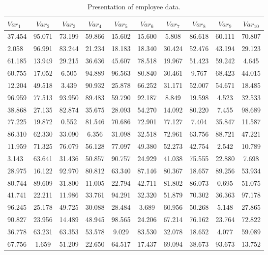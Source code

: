 \documentclass{article}
\begin{document}
\begin{table}[h!]
\centering
\caption{Presentation of employee data.}
\label{tab:data_emp}
\begin{tabular}{lccccccccc}
\toprule
$Var_1$ & $Var_2$ & $Var_3$ & $Var_4$ & $Var_5$ & $Var_6$ & $Var_7$ & $Var_8$ & $Var_9$ & $Var_{10}$ \\
\midrule
37.454 & 95.071 & 73.199 & 59.866 & 15.602 & 15.600 & 5.808 & 86.618 & 60.111 & 70.807 \\
2.058 & 96.991 & 83.244 & 21.234 & 18.183 & 18.340 & 30.424 & 52.476 & 43.194 & 29.123 \\
61.185 & 13.949 & 29.215 & 36.636 & 45.607 & 78.518 & 19.967 & 51.423 & 59.242 & 4.645 \\
60.755 & 17.052 & 6.505 & 94.889 & 96.563 & 80.840 & 30.461 & 9.767 & 68.423 & 44.015 \\
12.204 & 49.518 & 3.439 & 90.932 & 25.878 & 66.252 & 31.171 & 52.007 & 54.671 & 18.485 \\
96.959 & 77.513 & 93.950 & 89.483 & 59.790 & 92.187 & 8.849 & 19.598 & 4.523 & 32.533 \\
38.868 & 27.135 & 82.874 & 35.675 & 28.093 & 54.270 & 14.092 & 80.220 & 7.455 & 98.689 \\
77.225 & 19.872 & 0.552 & 81.546 & 70.686 & 72.901 & 77.127 & 7.404 & 35.847 & 11.587 \\
86.310 & 62.330 & 33.090 & 6.356 & 31.098 & 32.518 & 72.961 & 63.756 & 88.721 & 47.221 \\
11.959 & 71.325 & 76.079 & 56.128 & 77.097 & 49.380 & 52.273 & 42.754 & 2.542 & 10.789 \\
3.143 & 63.641 & 31.436 & 50.857 & 90.757 & 24.929 & 41.038 & 75.555 & 22.880 & 7.698 \\
28.975 & 16.122 & 92.970 & 80.812 & 63.340 & 87.146 & 80.367 & 18.657 & 89.256 & 53.934 \\
80.744 & 89.609 & 31.800 & 11.005 & 22.794 & 42.711 & 81.802 & 86.073 & 0.695 & 51.075 \\
41.741 & 22.211 & 11.986 & 33.761 & 94.291 & 32.320 & 51.879 & 70.302 & 36.363 & 97.178 \\
96.245 & 25.178 & 49.725 & 30.088 & 28.484 & 3.689 & 60.956 & 50.268 & 5.148 & 27.865 \\
90.827 & 23.956 & 14.489 & 48.945 & 98.565 & 24.206 & 67.214 & 76.162 & 23.764 & 72.822 \\
36.778 & 63.231 & 63.353 & 53.578 & 9.029 & 83.530 & 32.078 & 18.652 & 4.077 & 59.089 \\
67.756 & 1.659 & 51.209 & 22.650 & 64.517 & 17.437 & 69.094 & 38.673 & 93.673 & 13.752 \\

\end{tabular}
\end{table}
\end{document}
